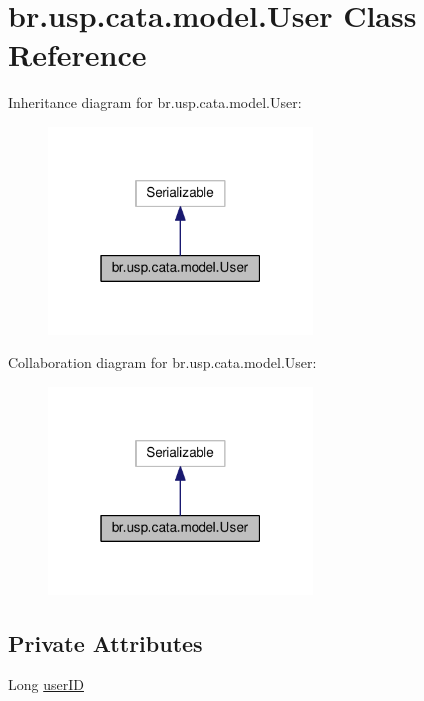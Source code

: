 \hypertarget{classbr_1_1usp_1_1cata_1_1model_1_1_user}{\section{br.\+usp.\+cata.\+model.\+User Class Reference}
\label{classbr_1_1usp_1_1cata_1_1model_1_1_user}
}


Inheritance diagram for br.\+usp.\+cata.\+model.\+User\+:\nopagebreak
\begin{figure}[H]
\begin{center}
\leavevmode
\includegraphics[width=199pt]{classbr_1_1usp_1_1cata_1_1model_1_1_user__inherit__graph}
\end{center}
\end{figure}


Collaboration diagram for br.\+usp.\+cata.\+model.\+User\+:\nopagebreak
\begin{figure}[H]
\begin{center}
\leavevmode
\includegraphics[width=199pt]{classbr_1_1usp_1_1cata_1_1model_1_1_user__coll__graph}
\end{center}
\end{figure}
\subsection*{Private Attributes}
\begin{DoxyCompactItemize}
\item 
Long \hyperlink{classbr_1_1usp_1_1cata_1_1model_1_1_user_a2f478f971d5774aa5c1dc996c4cf5384}{user\+I\+D}
\end{DoxyCompactItemize}
